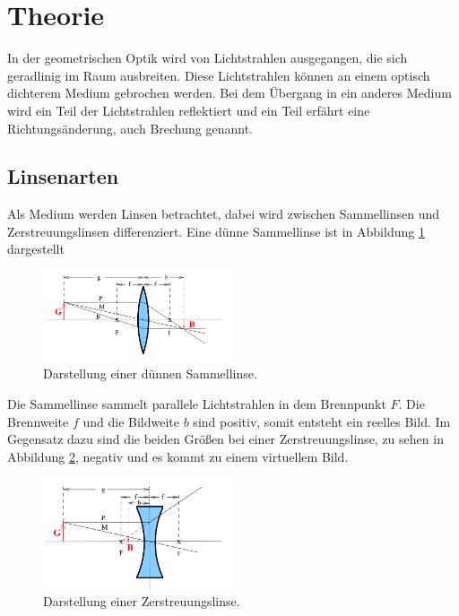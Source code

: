 \section{Theorie}
\label{sec:Theorie}
In der geometrischen Optik wird von Lichtstrahlen ausgegangen, die sich geradlinig im Raum ausbreiten.
Diese Lichtstrahlen können an einem optisch dichterem Medium gebrochen werden.
Bei dem Übergang in ein anderes Medium wird ein Teil der Lichtstrahlen reflektiert und ein Teil erfährt eine
Richtungsänderung, auch Brechung genannt.
\subsection{Linsenarten}
Als Medium werden Linsen betrachtet, dabei wird zwischen Sammellinsen und Zerstreuungslinsen
differenziert.
Eine dünne Sammellinse ist in Abbildung \ref{fig:duenn} dargestellt
\begin{figure}
 \centering
 \includegraphics[width=0.5\textwidth]{duenn.png}
 \caption{Darstellung einer dünnen Sammellinse.\cite{sample}}
 \label{fig:duenn}
 \end{figure}
Die Sammellinse sammelt parallele Lichtstrahlen in dem Brennpunkt $F$. Die Brennweite $f$ und die Bildweite $b$
sind positiv, somit entsteht ein reelles Bild. Im Gegensatz dazu sind die beiden Größen bei einer Zerstreuungslinse,
zu sehen in Abbildung \ref{fig:streu}, negativ und es kommt zu einem virtuellem Bild.
\begin{figure}
 \centering
 \includegraphics[width=0.5\textwidth]{streu.png}
 \caption{Darstellung einer Zerstreuungslinse.\cite{sample}}
 \label{fig:streu}
 \end{figure}
